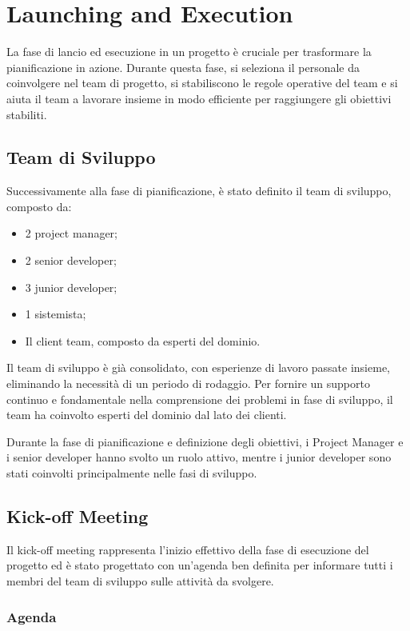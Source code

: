 \section{Launching and Execution}

La fase di lancio ed esecuzione in un progetto è cruciale per trasformare la pianificazione in azione. 
Durante questa fase, si seleziona il personale da coinvolgere nel team di progetto, si stabiliscono le regole operative del team 
e si aiuta il team a lavorare insieme in modo efficiente per raggiungere gli obiettivi stabiliti.

\subsection{Team di Sviluppo}

Successivamente alla fase di pianificazione, è stato definito il team di sviluppo, composto da:

\begin{itemize}
    \item 2 project manager;
    \item 2 senior developer;
    \item 3 junior developer;
    \item 1 sistemista;
    \item Il client team, composto da esperti del dominio.
\end{itemize}

Il team di sviluppo è già consolidato, con esperienze di lavoro passate insieme, eliminando la necessità di un periodo di rodaggio. Per fornire un supporto continuo e fondamentale nella comprensione dei problemi in fase di sviluppo, il team ha coinvolto esperti del dominio dal lato dei clienti.

Durante la fase di pianificazione e definizione degli obiettivi, i Project Manager e i senior developer hanno svolto un ruolo attivo, mentre i junior developer sono stati coinvolti principalmente nelle fasi di sviluppo.

\subsection{Kick-off Meeting}

Il kick-off meeting rappresenta l'inizio effettivo della fase di esecuzione del progetto ed è stato progettato con un'agenda ben definita per informare tutti i membri del team di sviluppo sulle attività da svolgere.

\subsubsection{Agenda}

